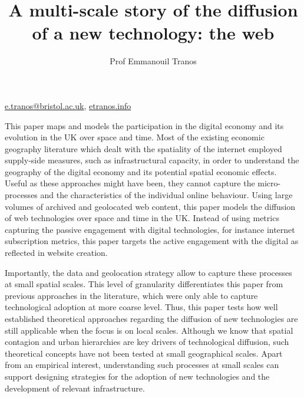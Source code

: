 \documentclass[11pt]{article}
\begin{document}
\author[1]{Prof Emmanouil Tranos}

\title{A multi-scale story of the diffusion of a new technology: the web}
\maketitle

\begin{center}
\href{mailto:e.tranos@bristol.ac.uk}{e.tranos@bristol.ac.uk},
\href{https://etranos.info/}{etranos.info}
\end{center}

\medskip

This paper maps and models the participation in the digital economy and its evolution in the UK over space and time. Most of the existing economic geography literature which dealt with the spatiality of the internet employed supply-side measures, such as infrastructural capacity, in order to understand the geography of the digital economy and its potential spatial economic effects. Useful as these approaches might have been, they cannot capture the micro-processes and the characteristics of the individual online behaviour. Using large volumes of archived and geolocated web content, this paper models the diffusion of web technologies over space and time in the UK. Instead of using metrics capturing the passive engagement with digital technologies, for instance internet subscription metrics, this paper targets the active engagement with the digital as reflected in website creation. 

Importantly, the data and geolocation strategy allow to capture these processes at small spatial scales. This level of granularity differentiates this paper from previous approaches in the literature, which were only able to capture technological adoption at more coarse level. Thus, this paper tests how well established theoretical approaches regarding the diffusion of new technologies are still applicable when the focus is on local scales. Although we know that spatial contagion and urban hierarchies are key drivers of technological diffusion, such theoretical concepts have not been tested at small geographical scales. Apart from an empirical interest, understanding such processes at small scales can support designing strategies for the adoption of new technologies and the development of relevant infrastructure. 
\end{document}
